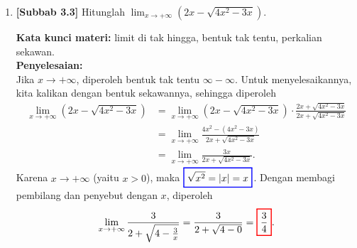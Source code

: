 \documentclass[10pt,openany,a4paper]{article}
\theoremstyle{definition}
\theoremstyle{definition}
\theoremstyle{plain}
\newenvironment{jawab}[2][tes]{%
\par\noindent\textbf{Kata kunci materi:} #1.\\
\textbf{Penyelesaian:} #2%
}{}
\begin{document}
\begin{enumerate}
    \item \textbf{[Subbab 3.3]} Hitunglah $\displaystyle\lim_{x\to+\infty}\left(2x-\sqrt{4x^2-3x}\right)$.
    \begin{jawab}[limit di tak hingga, bentuk tak tentu, perkalian sekawan]{~\\
        Jika $x\to+\infty$, diperoleh bentuk tak tentu $\infty-\infty$. Untuk menyelesaikannya, kita kalikan dengan bentuk sekawannya, sehingga diperoleh
        \begin{align*}
            \lim_{x\to+\infty}\left(2x-\sqrt{4x^2-3x}\right) &= \lim_{x\to+\infty}\left(2x-\sqrt{4x^2-3x}\right)\cdot\frac{2x+\sqrt{4x^2-3x}}{2x+\sqrt{4x^2-3x}}\\
            &= \lim_{x\to+\infty}\frac{4x^2-(4x^2-3x)}{2x+\sqrt{4x^2-3x}}\\
            &= \lim_{x\to+\infty}\frac{3x}{2x+\sqrt{4x^2-3x}}.
        \end{align*}
        Karena $x\to+\infty$ (yaitu $x>0$), maka $\colorlet{oldcolor}{.}
        \color{blue}
        \setlength{\fboxrule}{1pt} \boxed{\color{oldcolor}\sqrt{x^2}=|x|=x}\color{oldcolor}$. Dengan membagi pembilang dan penyebut dengan $x$, diperoleh
        \begin{align*}
            \lim_{x\to+\infty}\frac{3}{2+\sqrt{4-\frac{3}{x}}} = \frac{3}{2+\sqrt{4-0}} = \colorlet{oldcolor}{.}
        \color{red}
        \setlength{\fboxrule}{1pt} \boxed{\color{oldcolor}\frac{3}{4}}\color{oldcolor}.
        \end{align*}
    }
    \end{jawab}


\end{enumerate}
\end{document}
